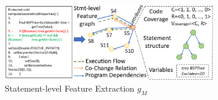 
\begin{figure}[t]
	\centering
	\includegraphics[width=3.6in]{graphs/step-1-statement-2.png}
        \vspace{-19pt}
	\caption{Statement-level Feature Extraction $g_M$}
        \vspace{-5pt}
	\label{statement-level-feature-extraction}
\end{figure}


